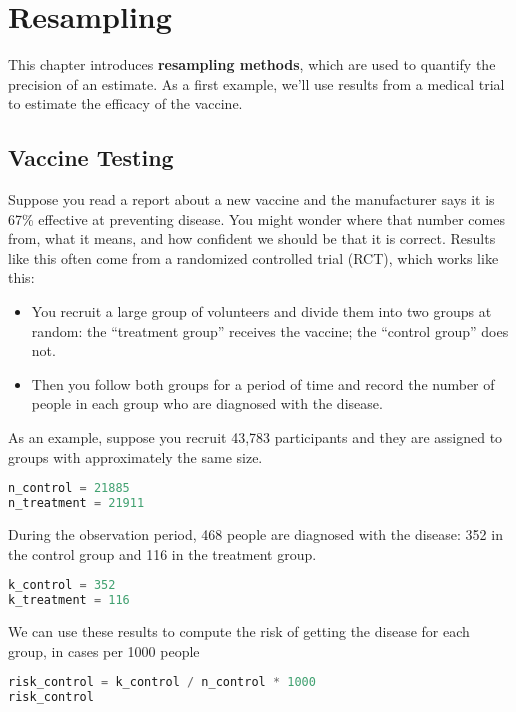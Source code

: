 \chapter{Resampling}\label{resampling}

This chapter introduces \textbf{resampling methods}, which are used to
quantify the precision of an estimate. As a first example, we'll use
results from a medical trial to estimate the efficacy of the vaccine.

\section{Vaccine Testing}\label{vaccine-testing}

Suppose you read a report about a new vaccine and the manufacturer says
it is 67\% effective at preventing disease. You might wonder where that
number comes from, what it means, and how confident we should be that it
is correct. Results like this often come from a randomized controlled
trial (RCT), which works like this:

\begin{itemize}
\item
  You recruit a large group of volunteers and divide them into two
  groups at random: the ``treatment group'' receives the vaccine; the
  ``control group'' does not.
\item
  Then you follow both groups for a period of time and record the number
  of people in each group who are diagnosed with the disease.
\end{itemize}

As an example, suppose you recruit 43,783 participants and they are
assigned to groups with approximately the same size.

\begin{lstlisting}[language=Python,style=source]
n_control = 21885
n_treatment = 21911
\end{lstlisting}

During the observation period, 468 people are diagnosed with the
disease: 352 in the control group and 116 in the treatment group.

\begin{lstlisting}[language=Python,style=source]
k_control = 352
k_treatment = 116
\end{lstlisting}

We can use these results to compute the risk of getting the disease for
each group, in cases per 1000 people

\begin{lstlisting}[language=Python,style=source]
risk_control = k_control / n_control * 1000
risk_control
\end{lstlisting}

